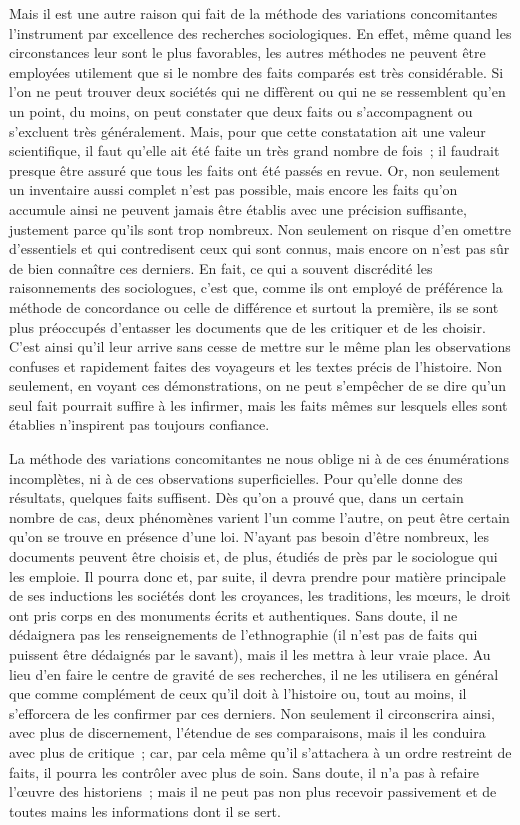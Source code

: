\documentclass[french,twoside]{book} %
\begin{document}
Mais il est une autre raison qui fait de la méthode des variations concomitantes l’instrument par excellence des recherches sociologiques. En effet, même quand les circonstances leur sont le plus favorables, les autres méthodes ne peuvent être employées utilement que si le nombre des faits comparés est très considérable. Si l’on ne peut trouver deux sociétés qui ne diffèrent ou qui ne se ressemblent qu’en un point, du moins, on peut constater que deux faits ou s’accompagnent ou s’excluent très généralement. Mais, pour que cette constatation ait une valeur scientifique, il faut qu’elle ait été faite un très grand nombre de fois ; il faudrait presque être assuré que tous les faits ont été passés en revue. Or, non seulement un inventaire aussi complet n’est pas possible, mais encore les faits qu’on accumule ainsi ne peuvent jamais être établis avec une précision suffisante, justement parce qu’ils sont trop nombreux. Non seulement on risque d’en omettre d’essentiels et qui contredisent ceux qui sont connus, mais encore on n’est pas sûr de bien connaître ces derniers. En fait, ce qui a souvent discrédité les raisonnements des sociologues, c’est que, comme ils ont employé de préférence la méthode de concordance ou celle de différence et surtout la première, ils se sont plus préoccupés d’entasser les documents que de les critiquer et de les choisir. C’est ainsi qu’il leur arrive sans cesse de mettre sur le même plan les observations confuses et rapidement faites des voyageurs et les textes précis de l’histoire. Non seulement, en voyant ces démonstrations, on ne peut s’empêcher de se dire qu’un seul fait pourrait suffire à les infirmer, mais les faits mêmes sur lesquels elles sont établies n’inspirent pas toujours confiance.\par
\par
La méthode des variations concomitantes ne nous oblige ni à de ces énumérations incomplètes, ni à de ces observations superficielles. Pour qu’elle donne des résultats, quelques faits suffisent. Dès qu’on a prouvé que, dans un certain nombre de cas, deux phénomènes varient l’un comme l’autre, on peut être certain qu’on se trouve en présence d’une loi. N’ayant pas besoin d’être nombreux, les documents peuvent être choisis et, de plus, étudiés de près par le sociologue qui les emploie. Il pourra donc et, par suite, il devra prendre pour matière principale de ses inductions les sociétés dont les croyances, les traditions, les mœurs, le droit ont pris corps en des monuments écrits et authentiques. Sans doute, il ne dédaignera pas les renseignements de l’ethnographie (il n’est pas de faits qui puissent être dédaignés par le savant), mais il les mettra à leur vraie place. Au lieu d’en faire le centre de gravité de ses recherches, il ne les utilisera en général que comme complément de ceux qu’il doit à l’histoire ou, tout au moins, il s’efforcera de les confirmer par ces derniers. Non seulement il circonscrira ainsi, avec plus de discernement, l’étendue de ses comparaisons, mais il les conduira avec plus de critique ; car, par cela même qu’il s’attachera à un ordre restreint de faits, il pourra les contrôler avec plus de soin. Sans doute, il n’a pas à refaire l’œuvre des historiens ; mais il ne peut pas non plus recevoir passivement et de toutes mains les informations dont il se sert.\par
\end{document}
